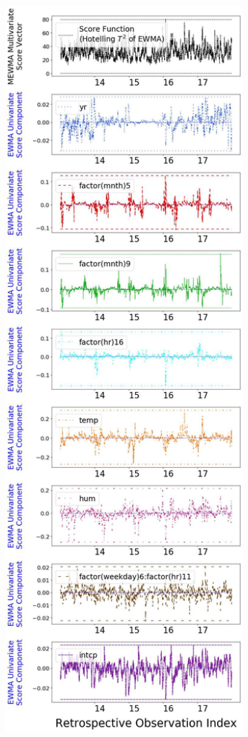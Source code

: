 \documentclass[twoside,11pt]{article}
\begin{document}
\begin{figure}[H]
\begin{subfigure}[t]{0.304\linewidth}
     \captionsetup{width=.95\linewidth}
     \caption{}
     \label{fig:bs_norm_retro}
\end{subfigure}
\begin{subfigure}[t]{0.304\linewidth}
     \centering
         \includegraphics[width=1.0\textwidth, trim=.0in .0in .0in .0in, clip]{../figures/v14/bike_sharing/reg_lin_C_2/quadr/Compressed_PII_pos_single_retro_bike_fisher_mlines_with_regu_1e-08_0_0001_0_01_99_99.png}

\end{subfigure}
\end{figure}
\end{document}
